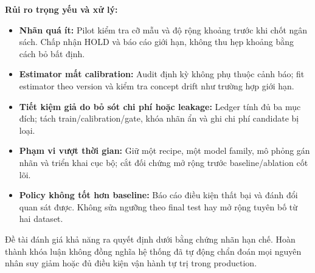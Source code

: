 \textbf{Rủi ro trọng yếu và xử lý:}
\begin{itemize}
  \item \textbf{Nhãn quá ít:} Pilot kiểm tra cỡ mẫu và độ rộng khoảng trước khi chốt ngân sách. Chấp nhận HOLD và báo cáo giới hạn, không thu hẹp khoảng bằng cách bỏ bất định.
  \item \textbf{Estimator mất calibration:} Audit định kỳ không phụ thuộc cảnh báo; fit estimator theo version và kiểm tra concept drift như trường hợp giới hạn.
  \item \textbf{Tiết kiệm giả do bỏ sót chi phí hoặc leakage:} Ledger tính đủ ba mục đích; tách train/calibration/gate, khóa nhãn ẩn và ghi chi phí candidate bị loại.
  \item \textbf{Phạm vi vượt thời gian:} Giữ một recipe, một model family, mô phỏng gán nhãn và triển khai cục bộ; cắt đối chứng mở rộng trước baseline/ablation cốt lõi.
  \item \textbf{Policy không tốt hơn baseline:} Báo cáo điều kiện thất bại và đánh đổi quan sát được. Không sửa ngưỡng theo final test hay mở rộng tuyên bố từ hai dataset.
\end{itemize}
Đề tài đánh giá khả năng ra quyết định dưới bằng chứng nhãn hạn chế. Hoàn thành khóa luận không đồng nghĩa hệ thống đã tự động chẩn đoán mọi nguyên nhân suy giảm hoặc đủ điều kiện vận hành tự trị trong production.
